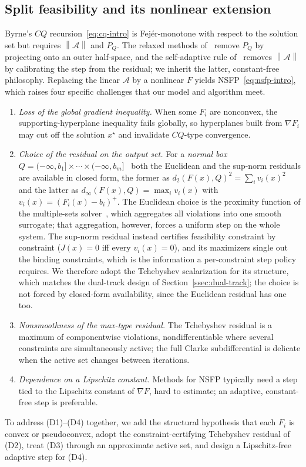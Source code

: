 \documentclass[]{interact}
\theoremstyle{plain}
\theoremstyle{definition}
\theoremstyle{remark}
\newcommand{\norm}[1]{\left\lVert #1 \right\rVert}
\begin{document}
\subsection{Split feasibility and its nonlinear extension}\label{ssec:sfp-prelim}
Byrne's $CQ$ recursion~\eqref{eq:cq-intro} is Fej\'er-monotone with respect to the
solution set but requires $\norm{\mathcal{A}}$ and $P_Q$. The relaxed methods
of~\citep{fukushima1986,yang2004} remove $P_Q$ by projecting onto an outer half-space,
and the self-adaptive rule of~\citep{lopez2012} removes $\norm{\mathcal{A}}$ by
calibrating the step from the residual; we inherit the latter, constant-free
philosophy. Replacing the linear $\mathcal{A}$ by a nonlinear $F$ yields
NSFP~\eqref{eq:nsfp-intro}, which raises four specific challenges that our model and
algorithm meet.
\begin{enumerate}[label=\textbf{(D\arabic*)},leftmargin=2.6em,itemsep=2pt]
\item \emph{Loss of the global gradient inequality.} When some $F_i$ are nonconvex,
the supporting-hyperplane inequality fails globally, so hyperplanes built from
$\nabla F_i$ may cut off the solution $x^\star$ and invalidate $CQ$-type convergence.
\item \emph{Choice of the residual on the output set.} For a \emph{normal box}
$Q=(-\infty,b_1]\times\cdots\times(-\infty,b_m]$~\citep{hoang2016} both the Euclidean and the
sup-norm residuals are available in closed form, the former as
$d_2(F(x),Q)^2=\sum_i v_i(x)^2$ and the latter as $d_\infty(F(x),Q)=\max_i v_i(x)$ with
$v_i(x)=(F_i(x)-b_i)^+$. The Euclidean choice is the proximity function of the multiple-sets
solver~\citep{li2013nsfp}, which aggregates all violations into one smooth surrogate; that aggregation, however, forces a uniform step on the whole system. The sup-norm residual
instead certifies feasibility constraint by constraint ($J(x)=0$ iff every $v_i(x)=0$), and
its maximizers single out the binding constraints, which is the information a per-constraint step policy requires. We therefore adopt the Tchebyshev scalarization for its structure, which matches the dual-track design of Section~\ref{ssec:dual-track}; the choice is not forced by closed-form availability, since the Euclidean residual has one too.
\item \emph{Nonsmoothness of the max-type residual.} The Tchebyshev residual is a
maximum of componentwise violations, nondifferentiable where several constraints are
simultaneously active; the full Clarke subdifferential is delicate when the active set
changes between iterations.
\item \emph{Dependence on a Lipschitz constant.} Methods for NSFP typically need a step
tied to the Lipschitz constant of $\nabla F$, hard to estimate; an adaptive,
constant-free step is preferable.
\end{enumerate}
To address (D1)--(D4) together, we add the structural hypothesis that each $F_i$
is convex or pseudoconvex, adopt the constraint-certifying Tchebyshev residual of (D2), treat
(D3) through an approximate active set, and design a Lipschitz-free adaptive step for (D4).
\end{document}
